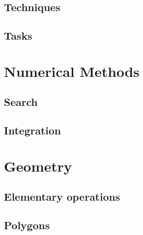 \documentclass[11pt,a4paper,oneside]{book}
\let\Oldpart\part
\newcommand\parttitle{}
\renewcommand\part[1]{\Oldpart{#1}\thispagestyle{empty}\renewcommand{\parttitle}{#1}}
\begin{document}
\chapter{Techniques}




\chapter{Tasks}



\part{Numerical Methods}
\chapter{Search}




\chapter{Integration}

\part{Geometry}
\chapter{Elementary operations}









\chapter{Polygons}






\end{document}

